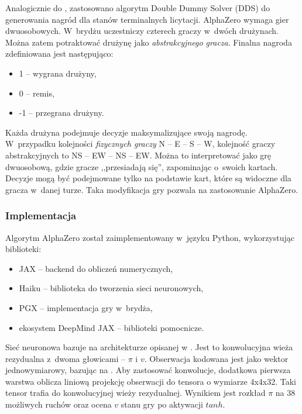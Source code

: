 Analogicznie do \cite{rong19,gong20,tian20,lockhart20}, zastosowano
algorytm Double Dummy Solver (DDS) \cite{DDS} do generowania
nagród dla stanów terminalnych licytacji.
AlphaZero wymaga gier dwuosobowych.
W~brydżu uczestniczy czterech graczy w~dwóch drużynach.
Można zatem potraktować drużynę jako \textit{abstrakcyjnego gracza}.
Finalna nagroda zdefiniowana jest następująco:
\begin{itemize}
  \item 1 -- wygrana drużyny,
  \item 0 -- remis,
  \item -1 -- przegrana drużyny.
\end{itemize}
Każda drużyna podejmuje decyzje maksymalizujące swoją nagrodę.
W~przypadku kolejności \textit{fizycznych graczy}
N -- E -- S -- W, kolejność graczy abstrakcyjnych to
NS -- EW -- NS -- EW.
Można to interpretować jako grę dwuosobową,
gdzie gracze ,,przesiadają się'', zapominając o~swoich kartach.
Decyzje mogą być podejmowane tylko na podstawie kart, które
są widoczne dla gracza w~danej turze.
Taka modyfikacja gry pozwala na zastosowanie AlphaZero.

\subsubsection{Implementacja}

Algorytm AlphaZero został zaimplementowany w~języku Python,
wykorzystując biblioteki:
\begin{itemize}
  \item JAX \cite{JAX} -- backend do obliczeń numerycznych,
  \item Haiku \cite{Haiku} -- biblioteka do tworzenia sieci neuronowych,
  \item PGX \cite{PGX} -- implementacja gry w~brydża,
  \item ekosystem DeepMind JAX \cite{JAXEcosystem} -- biblioteki pomocnicze.
\end{itemize}

Sieć neuronowa bazuje na architekturze opisanej w \cite{AlphaZeroPaper}.
Jest to konwolucyjna wieża rezydualna z~dwoma głowicami -- $\pi$ i $v$.
Obserwacja kodowana jest jako wektor jednowymiarowy,
bazując na \cite{lockhart20}.
Aby zastosować konwolucje, dodatkowa pierwsza warstwa
oblicza liniową projekcję obserwacji do tensora
o wymiarze 4x4x32. Taki tensor trafia do konwolucyjnej wieży rezydualnej.
Wynikiem jest rozkład $\pi$ na 38 możliwych ruchów oraz
ocena $v$ stanu gry po aktywacji $tanh$.

